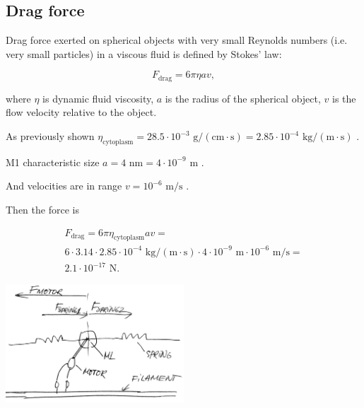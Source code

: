 \subsection{Drag force}

Drag force exerted on spherical objects with very small Reynolds numbers (i.e. very small particles) in a viscous fluid is defined by Stokes' law:

\begin{equation}
F_{\text{drag}} = 6\pi\eta av,
\end{equation}

where $\eta$ is dynamic fluid viscosity, $a$ is the radius of the spherical object, $v$ is the flow velocity relative to the object.

As previously shown $\eta_{\text{cytoplasm}} = 28.5 \cdot 10^{-3} \text{ g}/(\text{cm} \cdot \text{s}) = 2.85 \cdot 10^{-4} \text{ kg}/(\text{m} \cdot \text{s})$ \cite{swaminathan1997photobleaching, IAPWS2008}.

M1 characteristic size $a = 4 \text{ nm} = 4 \cdot 10^{-9} \text{ m}$ \cite{shtykova2013structural}.

And velocities are in range $v = 10^{-6} \text{ m/s}$ \cite{muller2008tug}.

Then the force is

\begin{equation}
\begin{split}
F_{\text{drag}} = 6\pi\eta_{\text{cytoplasm}} av = \\
6 \cdot 3.14 \cdot 2.85 \cdot 10^{-4} \text{ kg}/(\text{m} \cdot \text{s}) \cdot 4 \cdot 10^{-9} \text{ m} \cdot 10^{-6} \text{ m/s} =\\
2.1 \cdot 10^{-17} \text{ N}.
\end{split}
\end{equation}

\begin{center}
\includegraphics[width=0.5\textwidth]{D_chapters/1_TugOfWar/Capsid.jpg}
\end{center}

